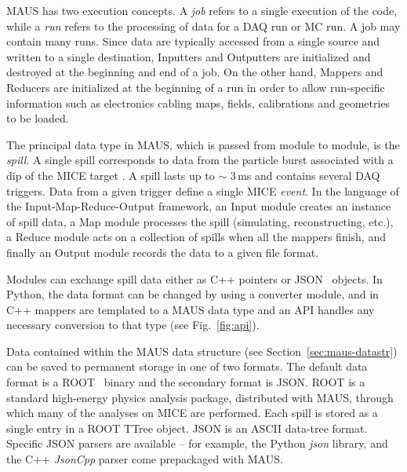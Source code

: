 \documentclass[11pt]{article}
\begin{document}
MAUS has two execution concepts. A \emph{job} refers to a single execution of the code, while a \emph{run} refers to the processing of data for a DAQ run or MC run. A job may contain many runs. Since data are typically accessed from a single source and written to a single destination, Inputters and Outputters are initialized and destroyed at the beginning and end of a job. On the other hand, Mappers and Reducers are initialized at the beginning of a run in order to allow run-specific information such as electronics cabling maps, fields, calibrations and geometries to be loaded.

The principal data type in MAUS, which is passed from module to module, is the \emph{spill}. A single spill corresponds to  data from the particle burst associated with a dip of the MICE target \cite{BeamlineJINST}. A spill lasts up to $\sim$ 3\,ms and contains several DAQ triggers.  Data from a given trigger define a single MICE \emph{event}. In the language of the Input-Map-Reduce-Output framework, an Input module creates an instance of spill data, a Map module processes the spill (simulating, reconstructing, etc.), a Reduce module acts on a collection of spills when all the mappers finish, and finally an Output module records the data to a given file format.

Modules can exchange spill data either as C++ pointers or JSON~\cite{JSON} objects. In Python, the data format can be changed by using a converter module, and in C++ mappers are templated to a MAUS data type and an API  handles any necessary conversion to that type (see Fig.~\ref{fig:api}). 


Data contained within the MAUS data structure (see Section~\ref{sec:maus-datastr}) can be saved to permanent storage in one of two formats. The default data format is a ROOT~\cite{ROOT} binary and the secondary format is JSON. ROOT is a standard high-energy physics analysis package, distributed with MAUS, through which many of the analyses on MICE are performed. Each spill is stored as a single entry in a ROOT TTree object.  JSON is an ASCII data-tree format. Specific JSON parsers are available -- for example, the Python \emph{json} library, and the C++ \emph{JsonCpp} \cite{JSONCPP} parser come prepackaged with MAUS. 
\end{document}
